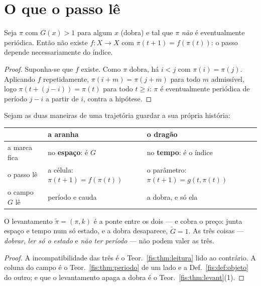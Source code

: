\documentclass[livro.tex]{subfiles}
\begin{document}

\section{O que o passo lê}\label{fis:trilema}

\begin{teorema}\label{fis:thm:leitura}
Seja $\pi$ com $G(x)>1$ para algum $x$ (dobra) e tal que $\pi$ \emph{não} é
eventualmente periódica. Então não existe $f\colon X\to X$ com
$\pi(t+1)=f(\pi(t))$: o passo depende necessariamente do índice.
\end{teorema}

\begin{proof}
Suponha-se que $f$ existe. Como $\pi$ dobra, há $i<j$ com $\pi(i)=\pi(j)$.
Aplicando $f$ repetidamente, $\pi(i+m)=\pi(j+m)$ para todo $m$ admissível, logo
$\pi(t+(j-i))=\pi(t)$ para todo $t\ge i$: $\pi$ é eventualmente periódica de
período $j-i$ a partir de $i$, contra a hipótese.
\end{proof}

\begin{corolario}\label{fis:cor:duais}
Sejam as duas maneiras de uma trajetória guardar a sua própria história:
\begin{center}\small
\begin{tabular}{@{}lll@{}}
\toprule
 & \textbf{a aranha} & \textbf{o dragão} \\
\midrule
a marca fica & no \textbf{espaço}: é $G$ & no \textbf{tempo}: é o índice \\
o passo lê & a célula: $\pi(t{+}1)=f(\pi(t))$ & o parâmetro: $\pi(t{+}1)=g(t,\pi(t))$ \\
o campo $G$ lê & período e cauda & a dobra, e só ela \\
\bottomrule
\end{tabular}
\end{center}
O levantamento $\tilde\pi=(\pi,k)$ é a ponte entre os dois --- e cobra o preço:
junta espaço e tempo num só estado, e a dobra desaparece, $\tilde G=1$. As
três coisas --- \emph{dobrar}, \emph{ler só o estado} e \emph{não ter período} ---
não podem valer as três.
\end{corolario}

\begin{proof}
A incompatibilidade das três é o Teor.~\ref{fis:thm:leitura} lido ao contrário. A
coluna do campo é o Teor.~\ref{fis:thm:periodo} de um lado e a
Def.~\ref{fis:def:objeto} do outro; e que o levantamento apaga a dobra é o
Teor.~\ref{fis:thm:levant}(1).
\end{proof}
\end{document}
